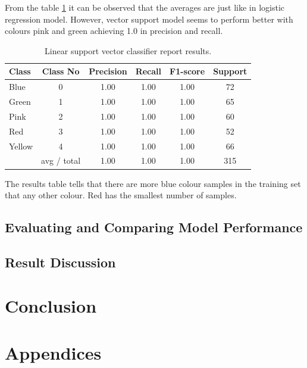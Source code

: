 \documentclass[11pt]{article}
\begin{document}
				From the table \ref{tbl:vector_resuts_multi} it can be observed that the averages are just like in logistic regression model. However, vector support model seems to perform better with colours pink and green achieving 1.0 in precision and recall. 
			\begin{center}
			  	\begin{table}[h]
			  	\centering
				\begin{tabular}[b]{| l | c | c | c | c | c |}
					\hline
					Class & Class No & Precision &  Recall & F1-score & Support  \\
		 			\hline
					Blue & 0  &   1.00   &   1.00   &   1.00   &   72 \\
          			Green & 1  &   1.00   &   1.00   &   1.00   &    65 \\
         			Pink & 2  &   1.00   &   1.00   &   1.00   &     60 \\
          			Red & 3  &   1.00   &   1.00   &   1.00   &     52 \\
          			Yellow & 4  &   1.00   &   1.00   &   1.00   &     66 \\
          			\hline
					 & avg / total   &   1.00   &   1.00   &   1.00  &      315 \\
					\hline
				\end{tabular}
				\caption{Linear support vector classifier report results.}
				\label{tbl:vector_resuts_multi}
				\end{table}
			\end{center}
			\vspace*{-1.3cm}

 			 The results table tells that there are more blue colour samples in the training set that any other colour. Red has the smallest number of samples.  

		\subsection{Evaluating and Comparing Model Performance}
		\subsection{Result Discussion}
	\section{Conclusion}

	\clearpage
	\appendix
	\section{Appendices}
\end{document}
